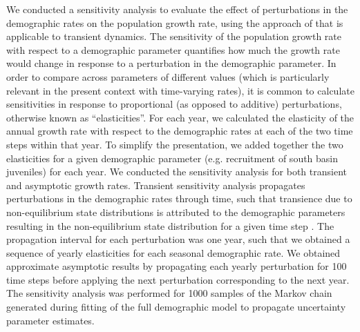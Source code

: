 We conducted a sensitivity analysis to evaluate the effect of perturbations 
in the demographic rates on the population growth rate, 
using the approach of \cite{caswell2007sensitivity} 
that is applicable to transient dynamics. 
The sensitivity of the population growth rate with respect to a demographic parameter
quantifies how much the growth rate would change in response to a perturbation in the 
demographic parameter. 
In order to compare across parameters of different values 
(which is particularly relevant in the present context with time-varying rates),
it is common to calculate sensitivities 
in response to proportional (as opposed to additive) perturbations,
otherwise known as ``elasticities''.
For each year, we calculated the elasticity of the annual growth rate with respect
to the demographic rates at each of the two time steps within that year.
To simplify the presentation, 
we added together the two elasticities for a given demographic parameter 
(e.g. recruitment of south basin juveniles) for each year.
We conducted the sensitivity analysis for both transient and asymptotic growth rates.
Transient sensitivity analysis propagates perturbations in the demographic rates 
through time, 
such that transience due to non-equilibrium state distributions is attributed to the
demographic parameters resulting in the non-equilibrium state distribution 
for a given time step
\citep[][relevant equations are reproduced in Appendix III]{caswell2007sensitivity}.
The propagation interval for each perturbation was one year, 
such that we obtained a sequence of yearly elasticities 
for each seasonal demographic rate.
We obtained approximate asymptotic results by propagating each yearly perturbation
for 100 time steps before applying the next perturbation corresponding to the next year.
The sensitivity analysis was performed for 1000 samples of the Markov chain generated during fitting of the full demographic model to propagate uncertainty parameter estimates.

